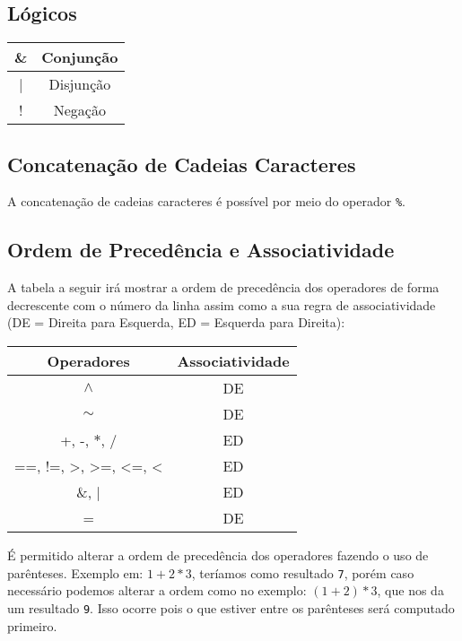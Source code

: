 \documentclass[a4paper,11pt]{article}
\begin{document}
\subsection{Lógicos}
\begin{center}
    \begin{tabular}{|c|c|}
         \hline
         \& & Conjunção\\
         \hline
         | & Disjunção\\
         \hline
         ! & Negação\\
         \hline
    \end{tabular}
\end{center}

\subsection{Concatenação de Cadeias Caracteres}
A concatenação de cadeias caracteres é possível por meio do operador \texttt{\%}.

\subsection{Ordem de Precedência e Associatividade}
A tabela a seguir irá mostrar a ordem de precedência dos operadores de forma decrescente com o
número da linha assim como a sua regra de associatividade (DE = Direita para Esquerda, ED = 
Esquerda para Direita):
\begin{center}
    \begin{tabular}{|c|c|}
         \hline
         \textbf{Operadores} & \textbf{Associatividade}\\
         \hline
         $\wedge$ & DE\\
         \hline
         $\sim$ & DE\\
         \hline
         +, -, $\ast$, / & ED\\
         \hline
         ==, !=, >, >=, <=, < & ED\\
         \hline
         \&, | & ED\\
         \hline
         = & DE\\
         \hline
    \end{tabular}
\end{center}

\hfill

É permitido alterar a ordem de precedência dos operadores fazendo o uso de parênteses.
Exemplo em: $1 + 2 * 3$, teríamos como resultado \texttt{7}, porém caso necessário podemos
alterar a ordem como no exemplo: $(1 + 2) * 3$, que nos da um resultado \texttt{9}. Isso ocorre
pois o que estiver entre os parênteses será computado primeiro.
\end{document}
